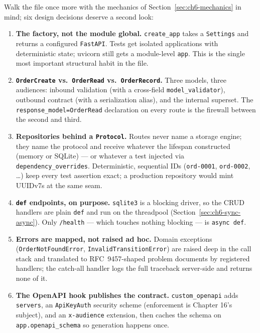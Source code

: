 Walk the file once more with the mechanics of
Section~\ref{sec:ch6-mechanics} in mind; six design decisions deserve a
second look:

\begin{enumerate}
  \item \textbf{The factory, not the module global.} \texttt{create\_app}
        takes a \texttt{Settings} and returns a configured \texttt{FastAPI}.
        Tests get isolated applications with deterministic state; uvicorn
        still gets a module-level \texttt{app}. This is the single most
        important structural habit in the file.
  \item \textbf{\texttt{OrderCreate} vs.\ \texttt{OrderRead} vs.\
        \texttt{OrderRecord}.} Three models, three audiences: inbound
        validation (with a cross-field \texttt{model\_validator}), outbound
        contract (with a serialization alias), and the internal superset.
        The \texttt{response\_model=OrderRead} declaration on every route is
        the firewall between the second and third.
  \item \textbf{Repositories behind a \texttt{Protocol}.} Routes never name
        a storage engine; they name the protocol and receive whatever the
        lifespan constructed (memory or SQLite) --- or whatever a test
        injected via \texttt{dependency\_overrides}. Deterministic,
        sequential IDs (\texttt{ord-0001}, \texttt{ord-0002}, \ldots) keep
        every test assertion exact; a production repository would mint
        UUIDv7s at the same seam.
  \item \textbf{\texttt{def} endpoints, on purpose.} \texttt{sqlite3} is a
        blocking driver, so the CRUD handlers are plain \texttt{def} and run
        on the threadpool (Section~\ref{sec:ch6-sync-async}). Only
        \texttt{/health} --- which touches nothing blocking --- is
        \texttt{async def}.
  \item \textbf{Errors are mapped, not raised ad hoc.} Domain exceptions
        (\texttt{OrderNotFoundError}, \texttt{InvalidTransitionError}) are
        raised deep in the call stack and translated to RFC~9457-shaped
        problem documents by registered handlers; the catch-all handler logs
        the full traceback server-side and returns none of it.
  \item \textbf{The OpenAPI hook publishes the contract.}
        \texttt{custom\_openapi} adds \texttt{servers}, an
        \texttt{ApiKeyAuth} security scheme (enforcement is Chapter 16's
        subject), and an \texttt{x-audience} extension, then caches the
        schema on \texttt{app.openapi\_schema} so generation happens once.
\end{enumerate}

